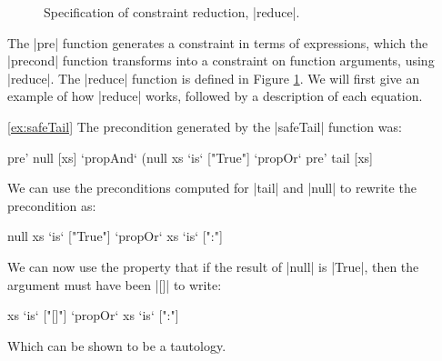 \documentclass[preprint]{sigplanconf}
\begin{document}
\begin{comment}
\begin{code}
substP ::  [alpha] -> Prop (Assert ArgPos) -> Prop (Assert alpha)
property  :: FuncName -> Constraint -> Prop (Assert ArgPos)
\end{code}
\end{comment}

\begin{figure}
\caption{Specification of constraint reduction, |reduce|.}
\label{fig:backward}
\end{figure}

The |pre| function generates a constraint in terms of expressions, which the |precond| function transforms into a constraint on function arguments, using |reduce|. The |reduce| function is defined in Figure \ref{fig:backward}. We will first give an example of how |reduce| works, followed by a description of each equation.

\begin{examplerevisit}{\ref{ex:safeTail}}
The precondition generated by the |safeTail| function was:

\ignore\begin{code}
pre' null [xs] `propAnd` (null xs `is` ["True"] `propOr` pre' tail [xs]
\end{code}

\noindent We can use the preconditions computed for |tail| and |null| to rewrite the precondition as:

\ignore\begin{code}
null xs `is` ["True"] `propOr` xs `is` [":"]
\end{code}

\noindent We can now use the property that if the result of |null| is |True|, then the argument must have been |[]| to write:

\ignore\begin{code}
xs `is` ["[]"] `propOr` xs `is` [":"]
\end{code}

\noindent Which can be shown to be a tautology.
\end{examplerevisit}
\end{document}
